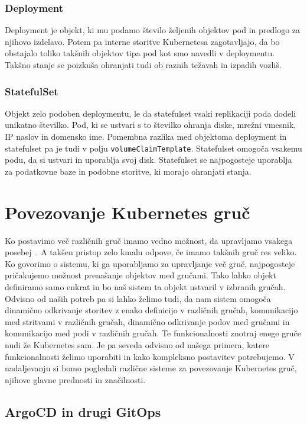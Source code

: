 \documentclass[a4paper, 12pt]{book}
\begin{document}
\subsection{Deployment~\cite{deployment}}
Deployment je objekt, ki mu podamo število željenih objektov pod in predlogo za njihovo izdelavo.
Potem pa interne storitve Kubernetesa zagotavljajo, da bo obstajalo toliko takšnih objektov tipa pod kot smo navedli v deploymentu.
Takšno stanje se poizkuša ohranjati tudi ob raznih težavah in izpadih vozliš.
\subsection{StatefulSet~\cite{statefulset}}
Objekt zelo podoben deploymentu, le da statefulset vsaki replikaciji poda dodeli unikatno številko. 
Pod, ki se ustvari s to številko ohranja diske, mrežni vmesnik, IP naslov in domensko ime.
Pomembna razlika med objektoma deployment in statefulset pa je tudi v polju \verb|volumeClaimTemplate|.
Statefulset omogoča vsakemu podu, da si ustvari in uporablja svoj disk.
Statefulset se najpogosteje uporablja za podatkovne baze in podobne storitve, ki morajo ohranjati stanja.
\chapter{Povezovanje Kubernetes gruč}
Ko postavimo več različnih gruč imamo vedno možnost, da upravljamo vsakega posebej~\cite{difference-multi-cluster}.
A takšen pristop zelo kmalu odpove, če imamo takšnih gruč res veliko.
Ko govorimo o sistemu, ki ga uporabljamo za upravljanje več gruč, najpogosteje pričakujemo možnost prenašanje objektov med gručami.
Tako lahko objekt definiramo samo enkrat in bo naš sistem ta objekt ustvaril v izbranih gručah.
Odvisno od naših potreb pa si lahko želimo tudi, da nam sistem omogoča dinamično odkrivanje storitev z enako definicijo v različnih gručah, komunikacijo med stritvami v različnih gručah, dinamično odkrivanje podov med gručami in komunikacijo med podi v različnih gručah.
Te funkcionalnosti znotraj enege gruče nudi že Kubernetes sam.
Je pa seveda odvisno od našega primera, katere funkcionalnosti želimo uporabiti in kako kompleksno postavitev potrebujemo.
V nadaljevanju si bomo pogledali različne sisteme za povezovanje Kubernetes gruč, njihove glavne prednosti in značilnosti.
  \section{ArgoCD in drugi GitOps}
\end{document}
